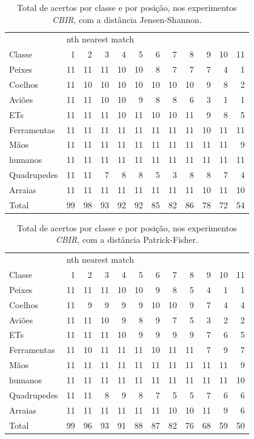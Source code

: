 \begin{table}
\centering
\caption{\label{tab:KimiaJensen-Shannon} Total de acertos por classe e por posição, nos experimentos \emph{CBIR}, com a distância Jensen-Shannon.}
\begin{tabular}{l| r r r r r r r r r r r}
\hline
&\multicolumn{11}{l}{nth nearest match} \\
\cline{2-12}
Classe&1&2&3&4&5&6&7&8&9&10&11 \\
 \hline
Peixes&11&11&11&10&10&8&7&7&7&4&1\\
Coelhos&11&10&10&10&10&10&10&10&9&8&2\\ 
Aviões&11&11&10&10&9&8&8&6&3&1&1\\
ETs&11&11&11&10&11&10&10&11&9&8&5\\
Ferramentas&11&11&11&11&11&11&11&11&10&11& 11\\
Mãos&11&11&11&11&11&11&11&11&11&11&9\\
humanos&11&11&11&11&11&11&11&11&11&11&11\\
Quadrupedes&11&11&7&8&8&5&3&8&8&7&4\\
Arraias&11&11&11&11&11&11&11&11&10&11&10\\
\hline
Total&99&98&93&92&92&85&82&86&78&72&54\\
\hline
\end{tabular}
\end{table}

\begin{table}
\centering
\caption{\label{tab:KimiaPatrick-Fisher} Total de acertos por classe e por posição, nos experimentos \emph{CBIR}, com a distância Patrick-Fisher.}
\begin{tabular}{l| r r r r r r r r r r r}
\hline
&\multicolumn{11}{l}{nth nearest match} \\
\cline{2-12}
Classe&1&2&3&4&5&6&7&8&9&10&11 \\
 \hline
Peixes&11&11&11&10&10&9&8&5&4&1&1\\
Coelhos&11&9&9&9&9&10&10&9&7&4&4\\ 
Aviões&11&11&10&9&8&9&7&5&3&2&2\\
ETs&11&11&11&10&9&9&9&9&7&6&5\\
Ferramentas&11&10&11&11&11&10&11&11&7&9  &7\\
Mãos&11&11&11&11&11&11&11&11&11&11&9\\
humanos&11&11&11&11&11&11&11&11&11&11&10\\
Quadrupedes&11&11&8&9&8&7&5&5&7&6&6\\
Arraias&11&11&11&11&11&11&10&10&11&9&6\\
\hline
Total&99&96&93&91&88&87&82&76&68&59&50\\
\hline
\end{tabular}
\end{table}


